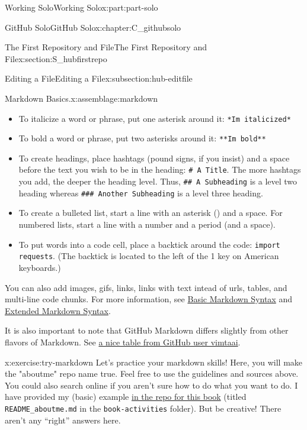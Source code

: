 \documentclass[oneside,10pt,]{book}
\newcommand{\mono}[1]{\texttt{#1}}
\begin{document}
\begin{partptx}{Working Solo}{}{Working Solo}{}{}{x:part:part-solo}
\begin{chapterptx}{GitHub Solo}{}{GitHub Solo}{}{}{x:chapter:C_githubsolo}
\begin{sectionptx}{The First Repository and File}{}{The First Repository and File}{}{}{x:section:S_hubfirstrepo}
\begin{subsectionptx}{Editing a File}{}{Editing a File}{}{}{x:subsection:hub-editfile}
\begin{assemblage}{Markdown Basics.}{x:assemblage:markdown}
\begin{itemize}[label=\textbullet]
\item{}To italicize a word or phrase, put one asterisk around it: \mono{*I\textquotesingle{}m italicized*}%
\item{}To bold a word or phrase, put two asterisks around it: \mono{**I\textquotesingle{}m bold**}%
\item{}To create headings, place hashtags (pound signs, if you insist)  and a space before the text you wish to be in the heading: \mono{\# A Title}. The more hashtags you add, the deeper the heading level. Thus, \mono{\#\# A Subheading} is a level two heading whereas \mono{\#\#\# Another Subheading} is a level three heading.%
\item{}To create a bulleted list, start a line with an asterisk (\textasteriskcentered{}) and a space. For numbered lists, start a line with a number and a period (and a space).%
\item{}To put words into a code cell, place a backtick around the code: \mono{\textasciigrave{}import requests\textasciigrave{}}. (The backtick is located to the left of the 1 key on American keyboards.)%
\end{itemize}
You can also add images, gifs, links, links with text intead of urls, tables, and multi-line code chunks. For more information, see \href{https://www.markdownguide.org/basic-syntax/}{Basic Markdown Syntax}\footnotemark{} and \href{https://www.markdownguide.org/extended-syntax/}{Extended Markdown Syntax}\footnotemark{}.%
\par
It is also important to note that GitHub Markdown differs slightly from other flavors of Markdown. See \href{https://gist.github.com/vimtaai/99f8c89e7d3d02a362117284684baa0f}{a nice table from GitHub user vimtaai}\footnotemark{}.%
\end{assemblage}
%
%
%
\begin{inlineexercise}{}{x:exercise:try-markdown}%
%
Let's practice your markdown skills! Here, you will make the "aboutme" repo name true. Feel free to use the guidelines and sources above. You could also search online if you aren't sure how to do what you want to do. I have provided my (basic) example \href{https://github.com/ian-curtis/gitstarted}{in the repo for this book}\footnotemark{} (titled \mono{README\_aboutme.md} in the \mono{book-activities} folder). But be creative! There aren't any ``right'' answers here.%

\end{inlineexercise}
\end{subsectionptx}
\end{sectionptx}
\end{chapterptx}
\end{partptx}
\end{document}
